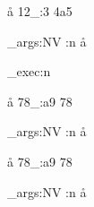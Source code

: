 \documentclass[12pt]{article}
\begin{document}
\begin{filecontentsdefxmacro}{\aa}
12_:3
4a5%
\end{filecontentsdefxmacro}

\ExplSyntaxOn

\exp_args:NV \pretty:n \aa

\precattl_exec:n{
\def \FCDtabtomacro {\cO\^^I}
}

\begin{filecontentsdefxmacro}{\aa}
	78_:a9
78%
\end{filecontentsdefxmacro}
\exp_args:NV \pretty:n \aa


\begin{filecontentsdefxmacro}{\aa}
 78_:a9
78%
\end{filecontentsdefxmacro}
\exp_args:NV \pretty:n \aa


\ExplSyntaxOff
\end{document}
